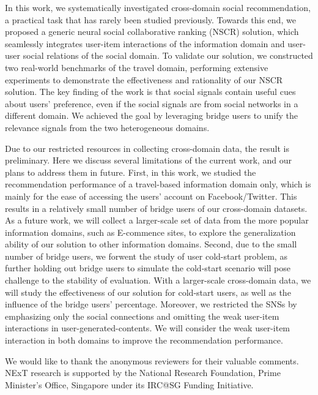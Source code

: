 \documentclass[sigconf]{acmart}
\begin{document}
In this work, we systematically investigated cross-domain social recommendation, a practical task that has rarely been studied previously.
Towards this end, we proposed a generic neural social collaborative ranking (NSCR) solution, which seamlessly integrates user-item interactions of the information domain and user-user social relations of the social domain. To validate our solution, we constructed two real-world benchmarks of the travel domain, performing extensive experiments to demonstrate the effectiveness and rationality of our NSCR solution. The key finding of the work is that social signals contain useful cues about users' preference, even if the social signals are from social networks in a different domain. We achieved the goal by leveraging bridge users to unify the relevance signals from the two heterogeneous domains.


Due to our restricted resources in collecting cross-domain data, the result is preliminary. Here we discuss several limitations of the current work, and our plans to address them in future.
First, in this work, we studied the recommendation performance of a travel-based information domain only, which is mainly for the ease of accessing the users' account on Facebook/Twitter. This results in a relatively small number of bridge users of our cross-domain datasets.
As a future work, we will collect a larger-scale set of data from the more popular information domains, such as E-commence sites, to explore the generalization ability of our solution to other information domains.
Second, due to the small number of bridge users, we forwent the study of user cold-start problem, as further holding out bridge users to simulate the cold-start scenario will pose challenge to the stability of evaluation.
With a larger-scale cross-domain data, we will study the effectiveness of our solution for cold-start users, as well as the influence of the bridge users' percentage.
Moreover, we restricted the SNSs by emphasizing only the social connections and omitting the weak user-item interactions in user-generated-contents. We will consider the weak user-item interaction in both domains to improve the recommendation performance.





\noindent We would like to thank the anonymous reviewers for their valuable comments. NExT research is supported by the National Research Foundation, Prime Minister's Office, Singapore under its IRC@SG Funding Initiative.




\balance


\balance
\end{document}

